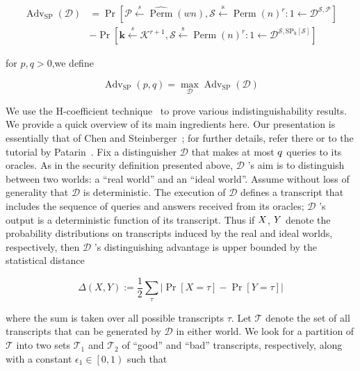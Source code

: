 \begin{equation}
\begin{aligned}
\operatorname{Adv}_{\mathrm{SP}}(\mathcal{D}) &=\operatorname{Pr}\left[\mathcal{P} \stackrel{s}{\leftarrow} \widehat{\operatorname{Perm}}(w n), \mathcal{S} \stackrel{\mathrm{s}}{\leftarrow} \operatorname{Perm}(n)^{r}: 1 \leftarrow \mathcal{D}^{\mathcal{S},\mathcal{P}}\right] \\
&-\operatorname{Pr}\left[\mathbf{k} \stackrel{s}{\leftarrow} \mathcal{K}^{r+1}, \mathcal{S} \stackrel{\mathrm{s}}{\leftarrow} \operatorname{Perm}(n)^{r}: 1 \leftarrow \mathcal{D}^{\mathcal{S}, \mathrm{SP}_{\mathrm{k}}[\mathcal{S}]}\right]
\end{aligned}
\end{equation}

for $p,q > 0$,we define

$$
\operatorname{Adv}_{\mathrm{SP}}(p, q)=\max _{\mathcal{D}} \operatorname{Adv}_{\mathrm{SP}}(\mathcal{D})
$$

We use the H-coefficient technique~\cite{SAC:Patarin08,EC:CheSte14} to prove various indistinguishability results. We provide a quick overview of its main ingredients here. Our presentation is essentially that of Chen and Steinberger~\cite{EC:CheSte14}; for further details, refer there or to the tutorial by Patarin~\cite{SAC:Patarin08}.
  Fix a distinguisher $\mathcal{D}$  that makes at most $\mathnormal{q}$ queries to its oracles. As in the security definition presented above, $\mathcal{D}$ 's  aim is to distinguish between two
worlds: a ``real world'' and an ``ideal world''. Assume without loss of generality that $\mathcal{D}$ is deterministic. The execution of $\mathcal{D}$  defines a transcript that includes the sequence of queries and answers received from its oracles; $\mathcal{D}$ 's output is a deterministic function of its transcript. Thus if $\mathnormal{X}$, $\mathnormal{Y}$ denote the probability distributions on transcripts induced by the real and ideal worlds, respectively, then $\mathcal{D}$ 's distinguishing advantage is upper bounded by the statistical distance

$$
\Delta(X, Y):=\frac{1}{2} \sum_{\tau}|\operatorname{Pr}[X=\tau]-\operatorname{Pr}[Y=\tau]|
$$

where the sum is taken over all possible transcripts $\tau$.
Let $\mathcal{T}$ denote the set of all transcripts that can be generated by $\mathcal{D}$ in either world. We look for a partition of $\mathcal{T}$  into two sets $\mathcal{T}_{1}$ and $\mathcal{T}_2$ of ``good'' and ``bad'' transcripts, respectively, along with a constant $\epsilon_{1} \in \left[0,1\right)$ such that

